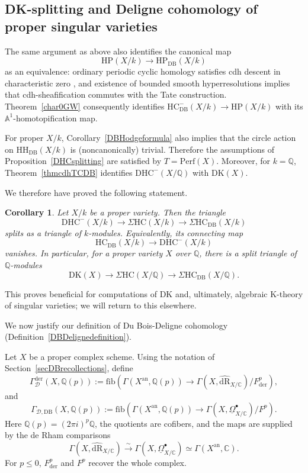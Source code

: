\documentclass{amsart}
\theoremstyle{plain}
\newtheorem{corollary}[prop]{Corollary}
\theoremstyle{definition}
\newcommand{\bbA}{\mathbb{A}}
\newcommand{\bbC}{\mathbb{C}}
\newcommand{\bbQ}{\mathbb{Q}}
\newcommand{\Perf}{\mathrm{Perf}}
\newcommand{\HH}{\mathrm{HH}}
\newcommand{\HC}{\mathrm{HC}}
\newcommand{\HP}{\mathrm{HP}}
\newcommand{\fib}{\mathrm{fib}}
\newcommand{\DK}{\mathrm{DK}}
\newcommand{\DHC}{\mathrm{DHC}}
\newcommand{\DB}{\mathrm{DB}}
\newcommand{\der}{\mathrm{der}}
\newcommand{\an}{\mathrm{an}}
\newcommand{\dR}{\mathrm{dR}}
\begin{document}
\medskip



\subsection{DK-splitting and Deligne cohomology of proper singular varieties}

The same argument as above also identifies the canonical map
\[
\HP(X/k)\longrightarrow \HP_{\DB}(X/k)
\]
as an equivalence: ordinary periodic cyclic homology satisfies cdh descent in characteristic zero \cite[Corollary 3.13]{CHSW08}, and existence of bounded smooth hyperresolutions implies that cdh-sheafification commutes with the Tate construction. Theorem~\ref{char0GW} consequently identifies
$\HC^-_{\DB}(X/k)\to \HP(X/k)$ with its $\bbA^1$-homotopification map.

For proper $X/k$, Corollary~\ref{DBHodgeformula} also implies that the circle action on $\HH_{\DB}(X/k)$ is (noncanonically)
trivial.
Therefore the assumptions of Proposition~\ref{DHCsplitting} are satisfied by $T=\Perf(X)$. Moreover, for $k=\bbQ$, Theorem~\ref{thmcdhTCDB} identifies $\DHC^-(X/\bbQ)$ with $\DK(X)$.

We therefore have proved the following statement.

\begin{corollary}\label{DKsplittingvarieties}
Let $X/k$ be a proper variety. Then the triangle
\[
\DHC^-(X/k)\longrightarrow\Sigma \HC(X/k)
\longrightarrow\Sigma \HC_{\DB}(X/k)
\]
splits as a triangle of $k$-modules. Equivalently, its connecting map
\[
\HC_{\DB}(X/k)\longrightarrow \DHC^-(X/k)
\]
vanishes. In particular, for a proper variety $X$ over $\bbQ$, there is a split triangle of $\bbQ$-modules
\[
\DK(X)\longrightarrow\Sigma \HC(X/\bbQ)
\longrightarrow\Sigma \HC_{\DB}(X/\bbQ).
\]
\end{corollary}


This proves beneficial for computations of $\DK$ and, ultimately, algebraic K-theory of singular varieties; we will return to this elsewhere.

\medskip

We now justify our definition of Du Bois-Deligne cohomology (Definition~\ref{DBDelignedefinition}). 












Let $X$ be a proper complex scheme. Using the notation of Section~\ref{secDBrecollections}, define
\[
\Gamma_{\mathcal D}^{\der}(X,\bbQ(p))
:=
\fib(
\Gamma(X^{\an},\bbQ(p))
\longrightarrow
\Gamma(X,\widehat{\dR}_{X/\bbC})/
F_{\der}^p
),
\]
and
\[
\Gamma_{\mathcal D, \DB}(X,\bbQ(p))
:=
\fib(
\Gamma(X^{\an},\bbQ(p))
\longrightarrow
\Gamma(X,\underline\Omega^\bullet_{X/\bbC})/F^p
).
\]
Here $\bbQ(p)=(2\pi i)^p\bbQ$, the quotients are cofibers, and the maps are supplied by the de Rham comparisons
\[
\Gamma(X,\widehat{\dR}_{X/\bbC})
\xrightarrow{\sim}
\Gamma(X,\underline\Omega^\bullet_{X/\bbC})
\simeq \Gamma(X^{\an},\bbC).
\]
For $p\leq0$, $F^p_{\der}$ and $F^p$ recover the whole complex.
\end{document}
